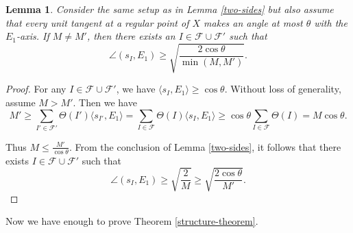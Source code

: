 \documentclass[11pt,reqno,twoside]{amsart}
\newtheorem{lemma}{Lemma}
\theoremstyle{definition}
\begin{document}
\begin{lemma} \label{same-mult}
    Consider the same setup as in Lemma \ref{two-sides} but also assume that every unit tangent at a regular point of $X$ makes an angle at most $\theta$ with the $E_1$-axis. If $M \neq M'$, then there exists an $I \in \mathcal{F} \cup \mathcal{F}'$ such that 
    \[\angle(s_I,E_1) \geq \sqrt{\frac{2\cos \theta}{\min(M,M')}}.\]
\end{lemma}
\begin{proof}
    For any $I \in \mathcal{F} \cup \mathcal{F}'$, we have $\langle s_I,E_1\rangle \geq \cos \theta$. Without loss of generality, assume $M > M'$. Then we have
    \[M' \geq \sum_{I' \in \mathcal{F}'} \Theta(I') \langle s_{I'},E_1\rangle = \sum_{I \in \mathcal{F}} \Theta(I) \langle s_I,E_1\rangle \geq \cos \theta\sum_{I \in \mathcal{F}} \Theta(I) = M \cos \theta.\]

Thus $M \leq \frac{M'}{\cos \theta}$. From the conclusion of Lemma \ref{two-sides}, it follows that there exists $I \in \mathcal{F} \cup \mathcal{F}'$ such that 
\[\angle(s_I,E_1) \geq \sqrt{\frac{2}{M}} \geq \sqrt{\frac{2\cos \theta}{M'}}.\]
\end{proof}

Now we have enough to prove Theorem \ref{structure-theorem}.
\end{document}
